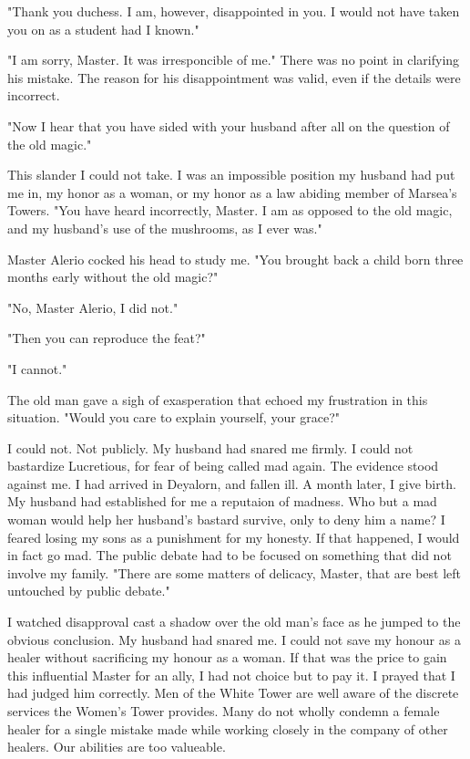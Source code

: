 \documentclass{article}
\begin{document}
"Thank you duchess. I am, however, disappointed in you. I would not have taken you on as a student had I known."

"I am sorry, Master. It was irresponcible of me." There was no point in clarifying his mistake. The reason for his disappointment was valid, even if the details were incorrect.

"Now I hear that you have sided with your husband after all on the question of the old magic." 

This slander I could not take. I was an impossible position my husband had put me in, my honor as a woman, or my honor as a law abiding member of Marsea's Towers. "You have heard incorrectly, Master. I am as opposed to the old magic, and my husband's use of the mushrooms, as I ever was."

Master Alerio cocked his head to study me. "You brought back a child born three months early without the old magic?"

"No, Master Alerio, I did not."

"Then you can reproduce the feat?" 

"I cannot."

The old man gave a sigh of exasperation that echoed my frustration in this situation. "Would you care to explain yourself, your grace?"

I could not. Not publicly. My husband had snared me firmly. I could not bastardize Lucretious, for fear of being called mad again. The evidence stood against me. I had arrived in Deyalorn, and fallen ill. A month later, I give birth. My husband had established for me a reputaion of madness. Who but a mad woman would help her husband's bastard survive, only to deny him a name? I feared losing my sons as a punishment for my honesty. If that happened, I would in fact go mad. The public debate had to be focused on something that did not involve my family. "There are some matters of delicacy, Master, that are best left untouched by public debate."

I watched disapproval cast a shadow over the old man's face as he jumped to the obvious conclusion. My husband had snared me. I could not save my honour as a healer without sacrificing my honour as a woman. If that was the price to gain this influential Master for an ally, I had not choice but to pay it. I prayed that I had judged him correctly. Men of the White Tower are well aware of the discrete services the Women's Tower provides. Many do not wholly condemn a female healer for a single mistake made while working closely in the company of other healers. Our abilities are too valueable. 
\end{document}
